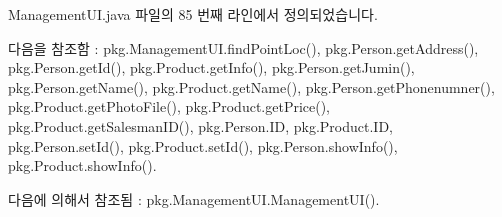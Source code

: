 Management\+U\+I.\+java 파일의 85 번째 라인에서 정의되었습니다.



다음을 참조함 \+:  pkg.\+Management\+U\+I.\+find\+Point\+Loc(), pkg.\+Person.\+get\+Address(), pkg.\+Person.\+get\+Id(), pkg.\+Product.\+get\+Info(), pkg.\+Person.\+get\+Jumin(), pkg.\+Person.\+get\+Name(), pkg.\+Product.\+get\+Name(), pkg.\+Person.\+get\+Phonenumner(), pkg.\+Product.\+get\+Photo\+File(), pkg.\+Product.\+get\+Price(), pkg.\+Product.\+get\+Salesman\+I\+D(), pkg.\+Person.\+ID, pkg.\+Product.\+ID, pkg.\+Person.\+set\+Id(), pkg.\+Product.\+set\+Id(), pkg.\+Person.\+show\+Info(), pkg.\+Product.\+show\+Info().



다음에 의해서 참조됨 \+:  pkg.\+Management\+U\+I.\+Management\+U\+I().


